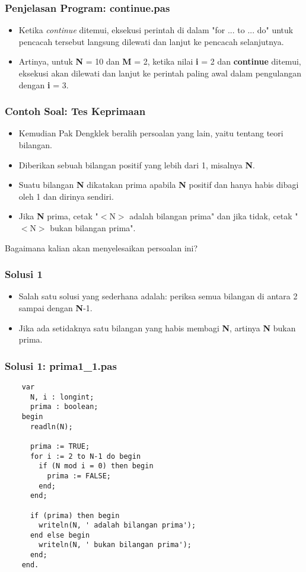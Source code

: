 \begin{frame}
\frametitle{Penjelasan Program: continue.pas}
\begin{itemize}
  \item Ketika \textit{continue} ditemui, eksekusi perintah di dalam "for ... to ... do" untuk pencacah tersebut langsung dilewati dan lanjut ke pencacah selanjutnya.
  \item Artinya, untuk \textbf{N} = 10 dan \textbf{M} = 2, ketika nilai \textbf{i} = 2 dan \textbf{continue} ditemui, eksekusi akan dilewati dan lanjut ke perintah paling awal dalam pengulangan dengan \textbf{i} = 3.
\end{itemize}
\end{frame}


\begin{frame}
\frametitle{Contoh Soal: Tes Keprimaan}
\begin{itemize}
  \item Kemudian Pak Dengklek beralih persoalan yang lain, yaitu tentang teori bilangan.
  \item Diberikan sebuah bilangan positif yang lebih dari 1, misalnya \textbf{N}.
  \item Suatu bilangan \textbf{N} dikatakan prima apabila \textbf{N} positif dan hanya habis dibagi oleh 1 dan dirinya sendiri.
  \item Jika \textbf{N} prima, cetak "$<$N$>$ adalah bilangan prima" dan jika tidak, cetak "$<$N$>$ bukan bilangan prima".
\end{itemize}
Bagaimana kalian akan menyelesaikan persoalan ini?
\end{frame}

\begin{frame}
\frametitle{Solusi 1}
\begin{itemize}
  \item Salah satu solusi yang sederhana adalah: periksa semua bilangan di antara 2 sampai dengan \textbf{N}-1.
  \item Jika ada setidaknya satu bilangan yang habis membagi \textbf{N}, artinya \textbf{N} bukan prima.
\end{itemize}
\end{frame}


\begin{frame}[fragile]
\frametitle{Solusi 1: prima1\_1.pas}
  \begin{lstlisting}
    var
      N, i : longint;
      prima : boolean;
    begin
      readln(N);

      prima := TRUE;
      for i := 2 to N-1 do begin
        if (N mod i = 0) then begin
          prima := FALSE;
        end;
      end;

      if (prima) then begin
        writeln(N, ' adalah bilangan prima');
      end else begin
        writeln(N, ' bukan bilangan prima');
      end;
    end.
  \end{lstlisting}
\end{frame}

